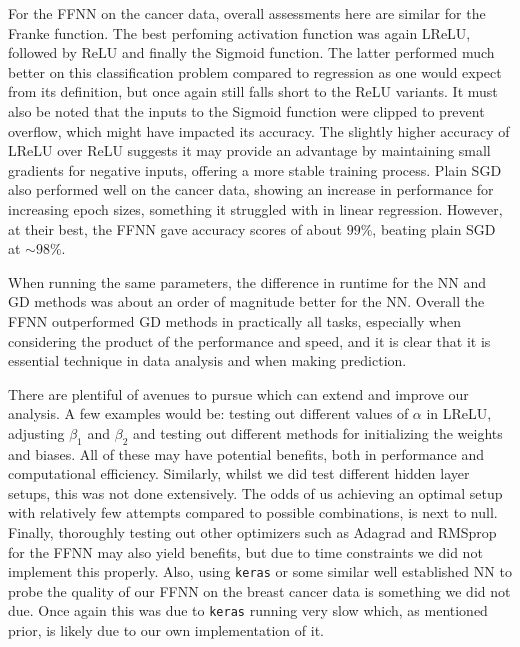 \documentclass[%
reprint,s
amsmath,amssymb,
aps,
]{revtex4-2}
\begin{document}
For the FFNN on the cancer data, overall assessments here are similar for the Franke function. The best perfoming activation function was again LReLU, followed by ReLU and finally the Sigmoid function. The latter performed much better on this classification problem compared to regression as one would expect from its definition, but once again still falls short to the ReLU variants. It must also be noted that the inputs to the Sigmoid function were clipped to prevent overflow, which might have impacted its accuracy. The slightly higher accuracy of LReLU over ReLU suggests it may provide an advantage by maintaining small gradients for negative inputs, offering a more stable training process. Plain SGD also performed well on the cancer data, showing an increase in performance for increasing epoch sizes, something it struggled with in linear regression. However, at their best, the FFNN gave accuracy scores of about \(99\%\), beating plain SGD at \(\sim 98\%\).

When running the same parameters, the difference in runtime for the NN and GD methods was about an order of magnitude better for the NN. Overall the FFNN outperformed GD methods in practically all tasks, especially when considering the product of the performance and speed, and it is clear that it is essential technique in data analysis and when making prediction. 

There are plentiful of avenues to pursue which can extend and improve our analysis. A few examples would be: testing out different values of $\alpha$ in LReLU, adjusting $\beta_1$ and $\beta_2$ and testing out different methods for initializing the weights and biases. All of these may have potential benefits, both in performance and computational efficiency. Similarly, whilst we did test different hidden layer setups, this was not done extensively. The odds of us achieving an optimal setup with relatively few attempts compared to possible combinations, is next to null. Finally, thoroughly testing out other optimizers such as Adagrad and RMSprop for the FFNN may also yield benefits, but due to time constraints we did not implement this properly. Also, using \texttt{keras} or some similar well established NN to probe the quality of our FFNN on the breast cancer data is something we did not due. Once again this was due to \texttt{keras} running very slow which, as mentioned prior, is likely due to our own implementation of it.



\end{document}
